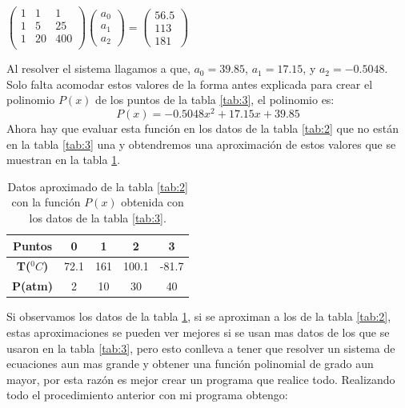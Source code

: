 \documentclass[12pt]{article}
\begin{document}
			\begin{center}
				$
				\left(\begin{array}{ccc}
					1 & 1 & 1 \\
					1 & 5 & 25 \\
					1 & 20 & 400 \\
			    \end{array}\right)
			    \left(\begin{array}{c}
					a_0 \\
					a_1 \\
					a_2 
			   	\end{array}\right)
			   	=
			   	\left(\begin{array}{c}
				 56.5 \\
				 113 \\
				 181 
		   		\end{array}\right)
			   	$
			\end{center}
			Al resolver el sistema llagamos a que, $ a_0 = 39.85 $, $ a_1 = 17.15$, y $ a_2 = -0.5048 $.
			Solo falta acomodar estos valores de la forma antes explicada para crear el polinomio $ P(x) $ 
			de los puntos de la tabla \ref{tab:3}, el polinomio es:
			$$ P(x) = -0.5048x^2 + 17.15x + 39.85 $$
			Ahora hay que evaluar esta función en los datos de la tabla \ref{tab:2} que no están en la tabla \ref{tab:3} una y 
			obtendremos una aproximación de estos valores que se muestran en la tabla \ref{tab:4}. 
			\begin{table}[h!]
				\centering
				\begin{tabular}{|c    c    c    c    c|}
					\hline
					\textbf{Puntos} & 0 & 1 & 2 & 3 \\\hline
					\textbf{T($^0C$)} & 72.1 & 161 & 100.1 & -81.7 \\\hline
					\textbf{P(atm)} & 2 & 10 & 30 & 40 \\\hline								
				\end{tabular}
				\caption{Datos aproximado de la tabla \ref{tab:2} con la función $P(x)$ obtenida con los datos de la tabla \ref{tab:3}.}
				\label{tab:4}
			\end{table}
			Si observamos los datos de la tabla \ref{tab:4}, si se aproximan a los de la tabla \ref{tab:2}, estas aproximaciones se 
			pueden ver mejores si se usan mas datos de los que se usaron en la tabla \ref{tab:3}, pero esto conlleva a 
			tener que resolver un sistema de ecuaciones aun mas grande y obtener una función polinomial de grado 
			aun mayor, por esta razón es mejor crear un programa que realice todo. 
			Realizando todo el procedimiento anterior con mi programa obtengo:
\end{document}

